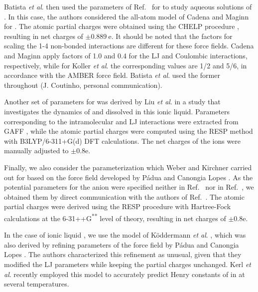 \documentclass[3p,twocolumn]{elsarticle}
\begin{document}
Batista \textit{et al}. \cite{Batista_2015} then used the parameters of Ref.~ for \ce{[B(CN)_4]^-} to study aqueous solutions of \ce{[emim][B(CN)_4]}.
In this case, the authors considered the all-atom model of Cadena and Maginn \cite{Cadena_2006} for \ce{[emim]^+}.
The atomic partial charges were obtained using the CHELP procedure \cite{Breneman_1990}, resulting in net charges of $\pm 0.889~\mathrm{e}$.
It should be noted that the factors for scaling the 1-4 non-bonded interactions are different for these force fields.
Cadena and Maginn \cite{Cadena_2006} apply factors of 1.0 and 0.4 for the LJ and Coulombic interactions, respectively, while for Koller \textit{et al}. \cite{Koller_2012} the corresponding values are 1/2 and 5/6, in accordance with the AMBER force field.
Batista \textit{et al}. \cite{Batista_2015} used the former throughout (J. Coutinho, personal communication).

Another set of parameters for \ce{[emim][B(CN)_4]} was derived by Liu \textit{et al}. \cite{Liu_2014} in a study that investigates the dynamics of  and  dissolved in this ionic liquid.
Parameters corresponding to the intramolecular and LJ interactions were extracted from GAFF \cite{Wang_2004}, while the atomic partial charges were computed using the RESP method \cite{Bayly_1993} with B3LYP/6-311+G(d) DFT calculations.
The net charges of the ions were manually adjusted to $\pm 0.8 \mathrm{e}$.

Finally, we also consider the parameterization which Weber and Kirchner \cite{Weber_2016} carried out for \ce{[emim][B(CN)_4]} based on the force field developed by P{\'{a}}dua and Canongia Lopes \cite{Canongia_Lopes_2006}.
As the potential parameters for the anion were specified neither in Ref.~ nor in Ref.~, we obtained them by direct communication with the authors of Ref.~.
The atomic partial charges were derived using the RESP procedure with Hartree-Fock calculations at the \mbox{6-31++G\textsuperscript{**}} level of theory, resulting in net charges of $\pm 0.8 \mathrm{e}$.

In the case of ionic liquid \ce{[emim][NTf_2]}, we use the model of K\"{o}ddermann \textit{et al}. \cite{K_ddermann_2007}, which was also derived by refining parameters of the force field by P{\'{a}}dua and Canongia Lopes \cite{Canongia_Lopes_2006}.
The authors characterized this refinement as unusual, given that they modified the LJ parameters while keeping the partial charges unchanged.
Kerl \textit{et al}. \cite{Kerl__2017} recently employed this model to accurately predict Henry constants of  in \ce{[emim][NTf_2]} at several temperatures.
\end{document}
